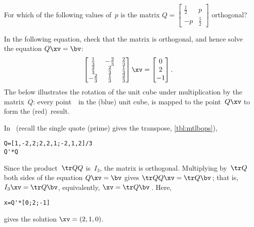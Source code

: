 \begin{activity}
For which of the following values of~\(p\) is the matrix \(Q=\begin{bmatrix} \frac12&p\\-p&\frac12 \end{bmatrix}\) orthogonal?
\end{activity}



\begin{example} \label{eg:3dorthog}
In the following equation, check that the matrix is orthogonal, and hence solve the equation \(Q\xv=\bv\):
\begin{equation*}
\begin{bmatrix} \frac13&-\frac23&\frac23
\\\frac23&\frac23&\frac13
\\-\frac23&\frac13&\frac23 \end{bmatrix}\xv
=\begin{bmatrix} 0\\2\\-1 \end{bmatrix}.
\end{equation*} 
The  below illustrates the rotation of the unit cube under multiplication by the matrix~\(Q\): every point~\xv\ in the (blue) unit cube, is mapped to the point~\(Q\xv\) to form the (red)~result.
\begin{center}
\def\unithousesize{footnotesize,height=5.5cm}
\end{center}
\begin{solution} In \script\ (recall the single quote (prime) gives the transpose, \autoref{tbl:mtlbops}),
\begin{verbatim}
Q=[1,-2,2;2,2,1;-2,1,2]/3
Q'*Q
\end{verbatim}
Since the product~\(\tr QQ\) is~\(I_3\), the matrix is orthogonal.  
Multiplying by~\(\tr Q\) both sides of the equation \(Q\xv=\bv\) gives \(\tr QQ\xv=\tr Q\bv\)\,; that is, \(I_3\xv=\tr Q\bv\), equivalently, \(\xv=\tr Q\bv\)\,.
Here,
\begin{verbatim}
x=Q'*[0;2;-1]
\end{verbatim}
\setbox\ajrqrbox\hbox{}%
\marginpar{\usebox{\ajrqrbox}}%
gives the solution \(\xv=(2,1,0)\).
\end{solution}
\end{example}


